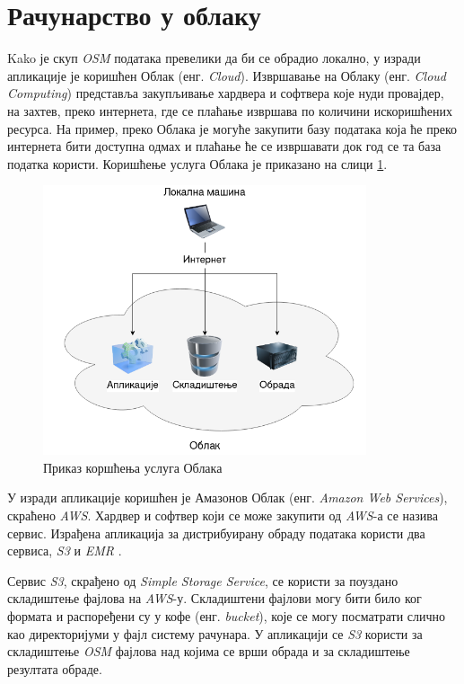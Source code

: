 \documentclass[12pt,oneside]{memoir}
\begin{document}
\section{Рачунарство у облаку}
\label{sec:cloud}

Kako је скуп \textit{OSM} података превелики да би се обрадио локално, у изради апликације је коришћен Облак (енг. \textit{Cloud}). Извршавање на Облаку (енг. \textit{Cloud Computing}) \cite{cloud_computing} представља закупљивање хардвера и софтвера које нуди провајдер, на захтев, преко интернета, где се плаћање извршава по количини искоришћених ресурса. На пример, преко Облака је могуће закупити базу података која ће преко интернета бити доступна одмах и плаћање ће се извршавати док год се та база податка користи. Коришћење услуга Облака је приказано на слици \ref{fig:cloud_comp_example}.

\begin{figure}[!ht]
  \centering
  \includegraphics[width=0.85\textwidth]{pictures/cloud_computing.png}
  \caption{Приказ коршћења услуга Облака}
  \label{fig:cloud_comp_example}
\end{figure}

У изради апликације коришћен је Амазонов Облак (енг. \textit{Amazon Web Services}), скраћено \textit{AWS}. Хардвер и софтвер који се може закупити од \textit{AWS}-а се назива сервис. Израђена апликација за дистрибуирану обраду података користи два сервиса, \textit{S3} \cite{s3} и \textit{EMR} \cite{emr}.


Сервис \textit{S3}, скрађено од \textit{Simple Storage Service}, се користи за поуздано складиштење фајлова на \textit{AWS}-у. Складиштени фајлови могу бити било ког формата и распоређени су у кофе (енг. \textit{bucket}), које се могу посматрати слично као директоријуми у фајл систему рачунара. У апликацији се \textit{S3} користи за складиштење \textit{OSM} фајлова над којима се врши обрада и за складиштење резултата обраде.
\end{document}
